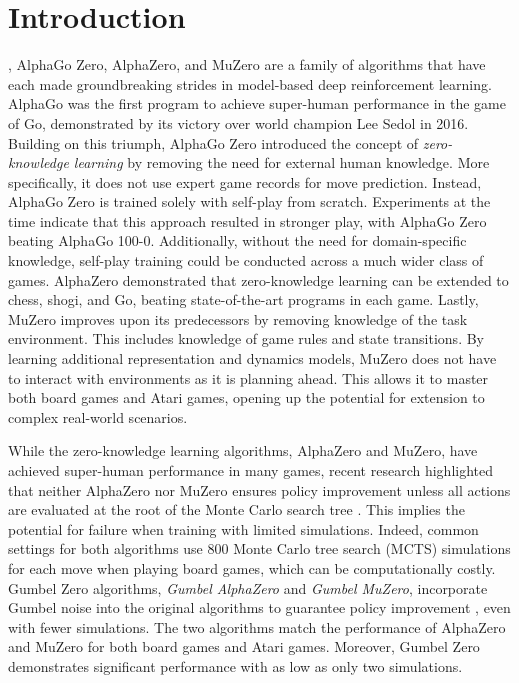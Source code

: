 \section{Introduction}
, AlphaGo Zero, AlphaZero, and MuZero are a family of algorithms that have each made groundbreaking strides in model-based deep reinforcement learning. 
AlphaGo \cite{silver_mastering_2016} was the first program to achieve super-human performance in the game of Go, demonstrated by its victory over world champion Lee Sedol in 2016.
Building on this triumph, AlphaGo Zero \cite{silver_mastering_2017} introduced the concept of \textit{zero-knowledge learning} by removing the need for external human knowledge. More specifically, it does not use expert game records for move prediction. Instead, AlphaGo Zero is trained solely with self-play from scratch. Experiments at the time indicate that this approach resulted in stronger play, with AlphaGo Zero beating AlphaGo 100-0.
Additionally, without the need for domain-specific knowledge, self-play training could be conducted across a much wider class of games.
AlphaZero \cite{silver_general_2018} demonstrated that zero-knowledge learning can be extended to chess, shogi, and Go, beating state-of-the-art programs in each game. 
Lastly, MuZero \cite{schrittwieser_mastering_2020} improves upon its predecessors by removing knowledge of the task environment. This includes knowledge of game rules and state transitions. By learning additional representation and dynamics models, MuZero does not have to interact with environments as it is planning ahead. This allows it to master both board games and Atari games, opening up the potential for extension to complex real-world scenarios.

While the zero-knowledge learning algorithms, AlphaZero and MuZero, have achieved super-human performance in many games, recent research highlighted that neither AlphaZero nor MuZero ensures policy improvement unless all actions are evaluated at the root of the Monte Carlo search tree \cite{danihelka_policy_2022}. This implies the potential for failure when training with limited simulations.
Indeed, common settings for both algorithms use 800 Monte Carlo tree search (MCTS) \cite{browne_survey_2012, coulom_efficient_2007, kocsis_bandit_2006} simulations for each move when playing board games, which can be computationally costly.
Gumbel Zero algorithms, \textit{Gumbel AlphaZero} and \textit{Gumbel MuZero}, incorporate Gumbel noise into the original algorithms to guarantee policy improvement \cite{danihelka_policy_2022}, even with fewer simulations.
The two algorithms match the performance of AlphaZero and MuZero for both board games and Atari games.
Moreover, Gumbel Zero demonstrates significant performance with as low as only two simulations.

